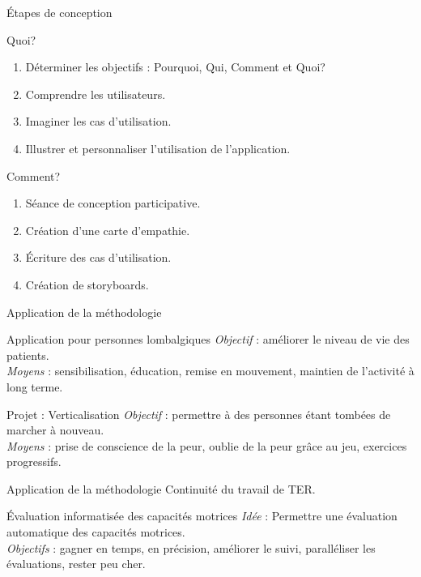 \documentclass{beamer}
\begin{document}
		\begin{frame}{Étapes de conception}
			\begin{block}{Quoi?}
				\begin{enumerate}
					\item Déterminer les objectifs : Pourquoi, Qui, Comment et Quoi? 
					\item Comprendre les utilisateurs.
					\item Imaginer les cas d'utilisation.
					\item Illustrer et personnaliser l'utilisation de l'application.
				\end{enumerate}
			\end{block}
			\begin{exampleblock}{Comment?}
				\begin{enumerate}
					\item Séance de conception participative.
					\item Création d'une carte d'empathie.
					\item Écriture des cas d'utilisation.
					\item Création de storyboards.
				\end{enumerate}
			\end{exampleblock}
		\end{frame}
		
		\begin{frame}{Application de la méthodologie}
			\begin{block}{Application pour personnes lombalgiques}
			\emph{Objectif} : améliorer le niveau de vie des patients.\\
			\emph{Moyens} : sensibilisation, éducation, remise en mouvement, maintien de l'activité à long terme.
			\end{block}
			
			\begin{block}{Projet : Verticalisation}
				\emph{Objectif} : permettre à des personnes étant tombées de marcher à nouveau.\\
				\emph{Moyens} : prise de conscience de la peur, oublie de la peur grâce au jeu, exercices progressifs.
			\end{block}			
		\end{frame}
		
		\begin{frame}{Application de la méthodologie}
		Continuité du travail de TER.
			\begin{block}{Évaluation informatisée des capacités motrices}
				\emph{Idée} : Permettre une évaluation automatique des capacités motrices.\\
				\emph{Objectifs} : gagner en temps, en précision, améliorer le suivi, paralléliser les évaluations, rester peu cher.
			\end{block}		
		\end{frame}
	
\end{document}
